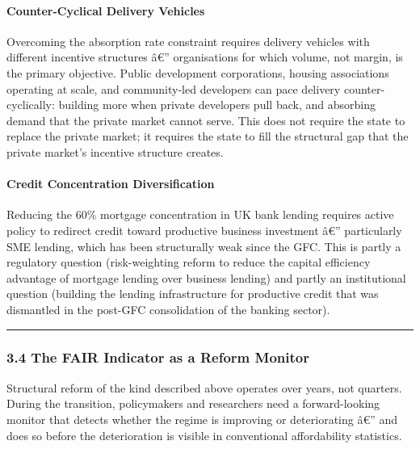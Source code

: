 \paragraph{Counter-Cyclical Delivery
Vehicles}\label{counter-cyclical-delivery-vehicles}

Overcoming the absorption rate constraint requires delivery vehicles
with different incentive structures â€'' organisations for which volume,
not margin, is the primary objective. Public development corporations,
housing associations operating at scale, and community-led developers
can pace delivery counter- cyclically: building more when private
developers pull back, and absorbing demand that the private market
cannot serve. This does not require the state to replace the private
market; it requires the state to fill the structural gap that the
private market's incentive structure creates.

\paragraph{Credit Concentration
Diversification}\label{credit-concentration-diversification}

Reducing the 60\% mortgage concentration in UK bank lending requires
active policy to redirect credit toward productive business investment
â€'' particularly SME lending, which has been structurally weak since
the GFC. This is partly a regulatory question (risk-weighting reform to
reduce the capital efficiency advantage of mortgage lending over
business lending) and partly an institutional question (building the
lending infrastructure for productive credit that was dismantled in the
post-GFC consolidation of the banking sector).

\begin{center}\rule{0.5\linewidth}{0.5pt}\end{center}

\subsubsection{3.4 The FAIR Indicator as a Reform
Monitor}\label{the-fair-indicator-as-a-reform-monitor}

Structural reform of the kind described above operates over years, not
quarters. During the transition, policymakers and researchers need a
forward-looking monitor that detects whether the regime is improving or
deteriorating â€'' and does so before the deterioration is visible in
conventional affordability statistics.

